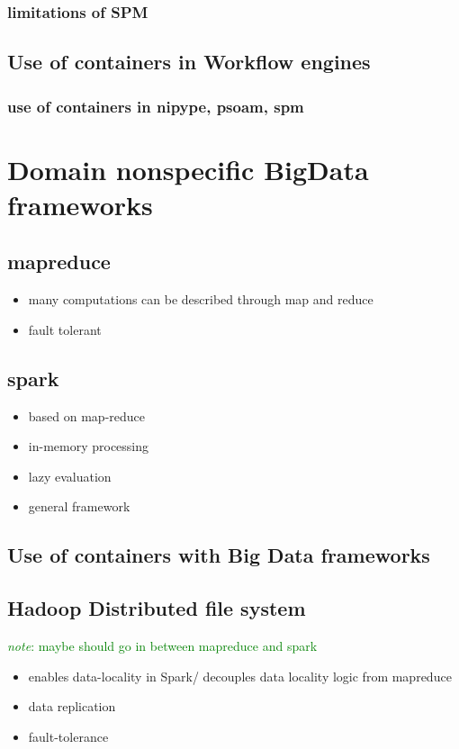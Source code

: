 \documentclass{report}
\newcommand{\note}[1]{\textcolor{green}{\textit{note}: #1}}
\begin{document}
		\subsection{limitations of SPM}
	\section{Use of containers in Workflow engines}
		\subsection{use of containers in nipype, psoam, spm}

\chapter{Domain nonspecific BigData frameworks}
	\section{mapreduce}
		\begin{itemize}
			\item many computations can be described through map and reduce
			\item fault tolerant
		\end{itemize}
	\section{spark}
		\begin{itemize}
			\item based on map-reduce
			\item in-memory processing
			\item lazy evaluation
			\item general framework
		\end{itemize}
	\section{Use of containers with Big Data frameworks}
	\section{Hadoop Distributed file system}
		\note{maybe should go in between mapreduce and spark}
		\begin{itemize}
			\item enables data-locality in Spark/ decouples data locality logic from mapreduce\
			\item data replication
			\item fault-tolerance
		\end{itemize}
\end{document}
